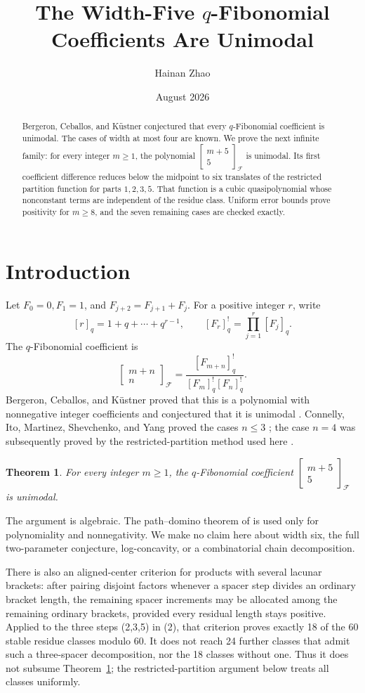 \documentclass[11pt]{article}
\title{The Width-Five \(q\)-Fibonomial Coefficients Are Unimodal}
\author{Hainan Zhao}
\date{August 2026}
\newtheorem{theorem}{Theorem}
\newcommand{\qfib}[2]{\left[\!\begin{matrix}#1\\#2\end{matrix}\!\right]_{\!\mathcal F}}
\begin{document}
\maketitle

\begin{abstract}
Bergeron, Ceballos, and K\"ustner conjectured that every
\(q\)-Fibonomial coefficient is unimodal.  The cases of width at most four
are known.  We prove the next infinite family: for every integer \(m\geq1\),
the polynomial \(\qfib{m+5}{5}\) is unimodal.  Its first coefficient
difference reduces below the midpoint to six translates of the restricted
partition function for parts \(1,2,3,5\).  That function is a cubic
quasipolynomial whose nonconstant terms are independent of the residue
class.  Uniform error bounds prove positivity for \(m\geq8\), and the seven
remaining cases are checked exactly.
\end{abstract}

\section{Introduction}

Let \(F_0=0,F_1=1\), and \(F_{j+2}=F_{j+1}+F_j\).  For a positive integer
\(r\), write
\[
 [r]_q=1+q+\cdots+q^{r-1},\qquad
 [F_r]^!_q=\prod_{j=1}^r[F_j]_q.
\]
The \(q\)-Fibonomial coefficient is
\[
 \qfib{m+n}{n}=\frac{[F_{m+n}]^!_q}{[F_m]^!_q[F_n]^!_q}.
\]
Bergeron, Ceballos, and K\"ustner proved that this is a polynomial with
nonnegative integer coefficients and conjectured that it is unimodal
\cite{BCK}.  Connelly, Ito, Martinez, Shevchenko, and Yang proved the cases
\(n\leq3\) \cite{CIMSY}; the case \(n=4\) was subsequently proved by the
restricted-partition method used here \cite{ZhaoWidthFour}.

\begin{theorem}\label{thm:main}
For every integer \(m\geq1\), the \(q\)-Fibonomial coefficient
\(\qfib{m+5}{5}\) is unimodal.
\end{theorem}

The argument is algebraic.  The path--domino theorem of \cite{BCK} is used
only for polynomiality and nonnegativity.  We make no claim here about width
six, the full two-parameter conjecture, log-concavity, or a combinatorial
chain decomposition.

There is also an aligned-center criterion for products with several
lacunar brackets: after pairing disjoint factors whenever a spacer step
divides an ordinary bracket length, the remaining spacer increments may be
allocated among the remaining ordinary brackets, provided every residual
length stays positive.  Applied to the three steps (2,3,5) in (2), that
criterion proves exactly 18 of the 60 stable residue classes modulo 60.  It
does not reach 24 further classes that admit such a three-spacer
decomposition, nor the 18 classes without one.  Thus it does not subsume
Theorem~\ref{thm:main}; the restricted-partition argument below treats all
classes uniformly.
\end{document}
